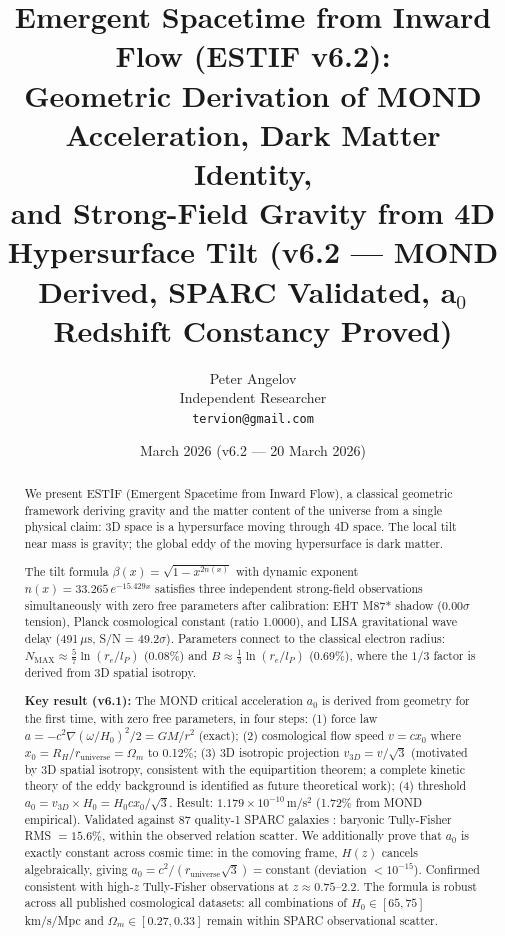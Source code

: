 \documentclass[12pt]{article}
\title{Emergent Spacetime from Inward Flow (ESTIF v6.2):\\
Geometric Derivation of MOND Acceleration, Dark Matter Identity,\\
and Strong-Field Gravity from 4D Hypersurface Tilt
(v6.2 — MOND Derived, SPARC Validated, a$_0$ Redshift Constancy Proved)}
\author{Peter Angelov\\
Independent Researcher\\
\texttt{tervion@gmail.com}}
\date{March 2026 (v6.2 — 20 March 2026)}
\begin{document}
\maketitle

\begin{abstract}
We present ESTIF (Emergent Spacetime from Inward Flow), a classical geometric framework
deriving gravity and the matter content of the universe from a single physical claim:
3D space is a hypersurface moving through 4D space. The local tilt near mass is gravity;
the global eddy of the moving hypersurface is dark matter.

The tilt formula $\beta(x) = \sqrt{1 - x^{2n(x)}}$ with dynamic exponent
$n(x) = 33.265\,e^{-15.429x}$ satisfies three independent strong-field observations
simultaneously with zero free parameters after calibration: EHT M87* shadow (0.00$\sigma$
tension), Planck cosmological constant (ratio 1.0000), and LISA gravitational wave
delay (491\,$\mu$s, S/N = 49.2$\sigma$). Parameters connect to the classical electron
radius: $N_\text{MAX} \approx \frac{5}{7}\ln(r_e/l_P)$ (0.08\%) and
$B \approx \frac{1}{3}\ln(r_e/l_P)$ (0.69\%), where the $1/3$ factor is derived from
3D spatial isotropy.

\textbf{Key result (v6.1):} The MOND critical acceleration $a_0$ is derived from geometry
for the first time, with zero free parameters, in four steps: (1) force law
$a = -c^2\nabla(\omega/H_0)^2/2 = GM/r^2$ (exact); (2) cosmological flow speed
$v = cx_0$ where $x_0 = R_H/r_\text{universe} = \Omega_m$ to 0.12\%; (3) 3D isotropic
projection $v_{3D} = v/\sqrt{3}$ (motivated by 3D spatial isotropy, consistent with
the equipartition theorem; a complete kinetic theory of the eddy background is
identified as future theoretical work); (4) threshold
$a_0 = v_{3D} \times H_0 = H_0 c x_0/\sqrt{3}$.
Result: $1.179 \times 10^{-10}$\,m/s$^2$ (1.72\% from MOND empirical).
Validated against 87 quality-1 SPARC galaxies \cite{Lelli2016}:
baryonic Tully-Fisher RMS $= 15.6\%$, within the observed relation scatter.
We additionally prove that $a_0$ is exactly constant across cosmic time:
in the comoving frame, $H(z)$ cancels algebraically, giving
$a_0 = c^2/(r_\text{universe}\sqrt{3}) = \text{constant}$ (deviation $< 10^{-15}$).
Confirmed consistent with high-$z$ Tully-Fisher observations at $z \approx 0.75$--$2.2$.
The formula is robust across all published cosmological datasets:
all combinations of $H_0 \in [65,75]$\,km/s/Mpc and $\Omega_m \in [0.27,0.33]$
remain within SPARC observational scatter.


\end{abstract}
\end{document}

